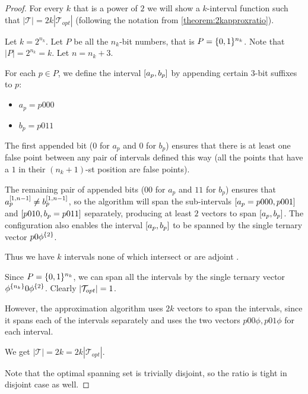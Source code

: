 \begin{proof}
For every $k$ that is a power of $2$
we will show a $k$-interval function such that
$|\mathcal{T}| = 2k |\mathcal{T}_{opt}|$
(following the notation from
\autoref{theorem:2kapproxratio}).

Let $k = 2^{n_k}$.
Let $P$ be all the $n_k$-bit numbers,
that is $P = \{0, 1\}^{n_k}$.
Note that $|P| = 2^{n_k} = k$.
Let $n = n_k + 3$.

For each $p \in P$,
we define the interval $[a_p, b_p]$
by appending certain $3$-bit suffixes to $p$:

\begin{itemize}
\item $a_p = p 000$
\item $b_p = p 011$
\end{itemize}

The first appended bit
($0$ for $a_p$ and $0$ for $b_p$)
ensures that there is at least one false point
between any pair of intervals defined this way
(all the points that have a $1$ in their $(n_k + 1)$-st
position are false points).

The remaining pair of appended bits
($00$ for $a_p$ and $11$ for $b_p$)
ensures that
$a_p^{[1, n-1]} \neq b_p^{[1, n-1]}$,
so the algorithm will span the sub-intervals
$[a_p = p 000, p 001]$
and $[p 010, b_p = p 011]$ separately,
producing at least $2$ vectors to span
$[a_p, b_p]$.
The configuration also enables
the interval $[a_p, b_p]$
to be spanned by the single ternary vector
$p 0 \phi^{\{2\}}$.

Thus we have $k$ intervals
none of which intersect or are adjoint
.

Since $P = \{0, 1\}^{n_k}$,
we can span all the intervals by the single ternary vector
$\phi^{\{n_k\}} 0 \phi^{\{2\}}$.
Clearly $\lvert\mathcal{T}_{opt}\rvert = 1$.

However,
the approximation algorithm uses $2k$ vectors to span
the intervals,
since it spans each of the intervals separately
and uses the two vectors
$p 0 0 \phi, p 0 1 \phi$
for each interval.

We get
$|\mathcal{T}| = 2k = 2k |\mathcal{T}_{opt}|$.

Note that the optimal spanning set is trivially disjoint,
so the ratio is tight in disjoint case as well.
\end{proof}

